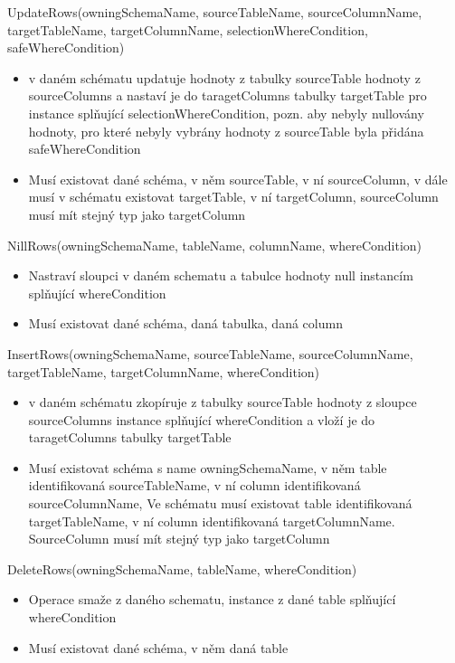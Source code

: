 \documentclass[11pt,twoside,a4paper]{book}
\begin{document}
\begin{list}{Operace :}{}
  \item UpdateRows(owningSchemaName, sourceTableName,
  sourceColumnName, targetTableName, targetColumnName,
  selectionWhereCondition, safeWhereCondition)
  \begin{itemize}
    \item v daném schématu updatuje hodnoty z tabulky sourceTable hodnoty z
    sourceColumns a nastaví je do taragetColumns tabulky targetTable pro
    instance splňující selectionWhereCondition, pozn. aby nebyly nullovány
    hodnoty, pro které nebyly vybrány hodnoty z sourceTable byla přidána
    safeWhereCondition
    \item Musí existovat dané schéma, v něm sourceTable, v ní sourceColumn, v
    dále musí v schématu existovat targetTable, v ní targetColumn, sourceColumn
    musí mít stejný typ jako targetColumn
  \end{itemize}

  \item NillRows(owningSchemaName, tableName, columnName, whereCondition)
  \begin{itemize}
    \item Nastraví sloupci v daném schematu a tabulce hodnoty null instancím
    splňující whereCondition
    \item Musí existovat dané schéma, daná tabulka, daná column
  \end{itemize}

  \item InsertRows(owningSchemaName, sourceTableName, sourceColumnName,
  targetTableName, targetColumnName, whereCondition)
  \begin{itemize}
    \item v daném schématu zkopíruje z tabulky sourceTable hodnoty z
    sloupce sourceColumns instance splňující whereCondition a vloží je do
    taragetColumns tabulky targetTable    
    \item Musí existovat schéma s name owningSchemaName, v něm table
    identifikovaná sourceTableName, v ní column identifikovaná sourceColumnName,
    Ve schématu musí existovat table identifikovaná targetTableName, v ní
    column identifikovaná targetColumnName. SourceColumn musí mít stejný typ
    jako targetColumn
  \end{itemize}

  \item DeleteRows(owningSchemaName, tableName, whereCondition)
  \begin{itemize}
    \item Operace smaže z daného schematu, instance z dané table
    splňující whereCondition
    \item Musí existovat dané schéma, v něm daná table
  \end{itemize}

\end{list}
\end{document}
